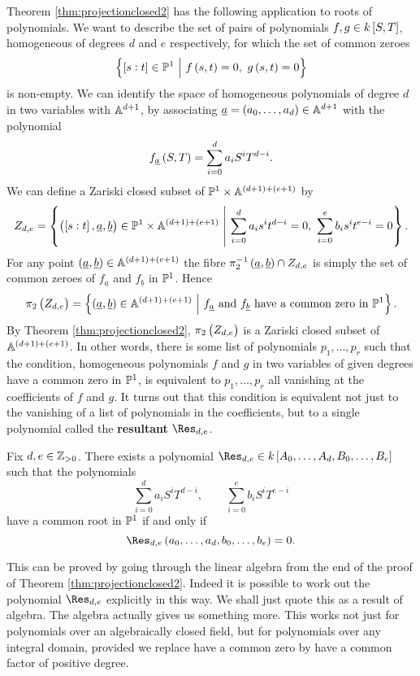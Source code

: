 Theorem \ref{thm:projectionclosed2} has the following application to roots of polynomials. We want to describe the set of pairs of polynomials $ f, g \in k\sbr{S, T} $, homogeneous of degrees $ d $ and $ e $ respectively, for which the set of common zeroes
$$ \cbr{\sbr{s : t} \in \PP^1 \st f\br{s, t} = 0, \ g\br{s, t} = 0} $$
is non-empty. We can identify the space of homogeneous polynomials of degree $ d $ in two variables with $ \AA^{d + 1} $, by associating $ \underline{a} = \br{a_0, \dots, a_d} \in \AA^{d + 1} $ with the polynomial
$$ f_{\underline{a}}\br{S, T} = \sum_{i = 0}^d a_iS^iT^{d - i}. $$
We can define a Zariski closed subset of $ \PP^1 \times \AA^{\br{d + 1} + \br{e + 1}} $ by
$$ Z_{d, e} = \cbr{\br{\sbr{s : t}, \underline{a}, \underline{b}} \in \PP^1 \times \AA^{\br{d + 1} + \br{e + 1}} \st \sum_{i = 0}^d a_is^it^{d - i} = 0, \ \sum_{i = 0}^e b_is^it^{e - i} = 0}. $$
For any point $ \br{\underline{a}, \underline{b}} \in \AA^{\br{d + 1} + \br{e + 1}} $ the fibre $ \pi_2^{-1}\br{\underline{a}, \underline{b}} \cap Z_{d, e} $ is simply the set of common zeroes of $ f_{\underline{a}} $ and $ f_{\underline{b}} $ in $ \PP^1 $. Hence
$$ \pi_2\br{Z_{d, e}} = \cbr{\br{\underline{a}, \underline{b}} \in \AA^{\br{d + 1} + \br{e + 1}} \st f_{\underline{a}} \ \text{and} \ f_{\underline{b}} \ \text{have a common zero in} \ \PP^1}. $$
By Theorem \ref{thm:projectionclosed2}, $ \pi_2\br{Z_{d, e}} $ is a Zariski closed subset of $ \AA^{\br{d + 1} + \br{e + 1}} $. In other words, there is some list of polynomials $ p_1, \dots, p_r $ such that the condition, homogeneous polynomials $ f $ and $ g $ in two variables of given degrees have a common zero in $ \PP^1 $, is equivalent to $ p_1, \dots, p_r $ all vanishing at the coefficients of $ f $ and $ g $. It turns out that this condition is equivalent not just to the vanishing of a list of polynomials in the coefficients, but to a single polynomial called the \textbf{resultant} $ \Res_{d, e} $.

\pagebreak

\begin{theorem}
\label{thm:fieldresultant}
Fix $ d, e \in \ZZ_{> 0} $. There exists a polynomial $ \Res_{d, e} \in k\sbr{A_0, \dots, A_d, B_0, \dots, B_e} $ such that the polynomials
$$ \sum_{i = 0}^d a_iS^iT^{d - i}, \qquad \sum_{i = 0}^e b_iS^iT^{e - i} $$
have a common root in $ \PP^1 $ if and only if
$$ \Res_{d, e}\br{a_0, \dots, a_d, b_0, \dots, b_e} = 0. $$
\end{theorem}

This can be proved by going through the linear algebra from the end of the proof of Theorem \ref{thm:projectionclosed2}. Indeed it is possible to work out the polynomial $ \Res_{d, e} $ explicitly in this way. We shall just quote this as a result of algebra. The algebra actually gives us something more. This works not just for polynomials over an algebraically closed field, but for polynomials over any integral domain, provided we replace have a common zero by have a common factor of positive degree.

